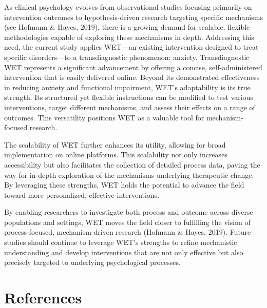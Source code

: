 \documentclass[
  man,floatsintext]{apa7}
\begin{document}
As clinical psychology evolves from observational studies focusing primarily on intervention outcomes to hypothesis-driven research targeting specific mechanisms (see Hofmann \& Hayes, 2019), there is a growing demand for scalable, flexible methodologies capable of exploring these mechanisms in depth.
Addressing this need, the current study applies WET---an existing intervention designed to treat specific disorders---to a transdiagnostic phenomenon: anxiety.
Transdiagnostic WET represents a significant advancement by offering a concise, self-administered intervention that is easily delivered online.
Beyond its demonstrated effectiveness in reducing anxiety and functional impairment, WET's adaptability is its true strength.
Its structured yet flexible instructions can be modified to test various interventions, target different mechanisms, and assess their effects on a range of outcomes.
This versatility positions WET as a valuable tool for mechanism-focused research.

The scalability of WET further enhances its utility, allowing for broad implementation on online platforms.
This scalability not only increases accessibility but also facilitates the collection of detailed process data, paving the way for in-depth exploration of the mechanisms underlying therapeutic change.
By leveraging these strengths, WET holds the potential to advance the field toward more personalized, effective interventions.

By enabling researchers to investigate both process and outcome across diverse populations and settings, WET moves the field closer to fulfilling the vision of process-focused, mechanism-driven research (Hofmann \& Hayes, 2019).
Future studies should continue to leverage WET's strengths to refine mechanistic understanding and develop interventions that are not only effective but also precisely targeted to underlying psychological processes.

\newpage

\section{References}\label{references}
\end{document}
